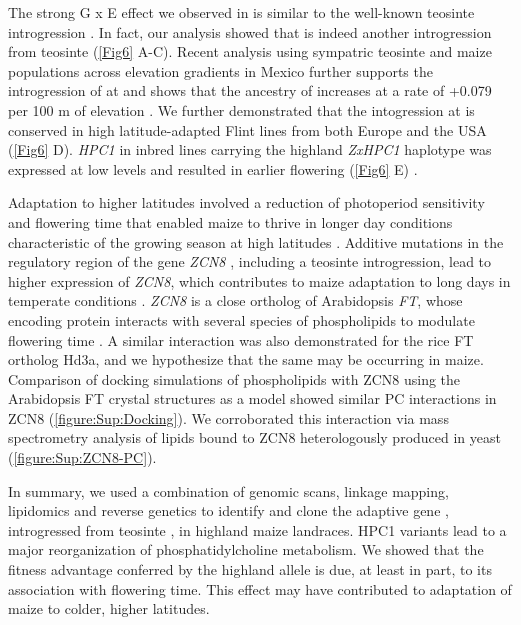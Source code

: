 The strong G x E effect we observed in \hpc is similar to the well-known teosinte \mex introgression \invfour \citep{crow2020}. 
In fact, our analysis showed that \hpc is indeed another introgression from teosinte \mex  (\autoref{Fig6} A-C). 
Recent analysis using sympatric teosinte and maize populations across elevation gradients in Mexico further supports the introgression of \mex at \hpc and shows that the \mex ancestry of \hpc increases at a rate of +0.079 per 100 m of elevation \citep{calfee2021-mr}.
We further demonstrated that the \mex intogression at \hpc is conserved in high latitude-adapted Flint lines from both Europe and the USA (\autoref{Fig6} D).
\textit{HPC1} in inbred lines carrying the highland \textit{ZxHPC1} \mex haplotype was expressed at low levels and resulted in earlier flowering (\autoref{Fig6} E) \citep{kremling2018-gn}.  

Adaptation to higher latitudes involved a reduction of photoperiod sensitivity and flowering time that enabled maize to thrive in longer day conditions characteristic of the growing season at high latitudes \citep{hung2012-ms, swarts2017-ge, yang2013-lg, huang2018-ga}.
Additive mutations in the regulatory region of the gene \textit{ZCN8} \citep{lazakis2011-nq}, including a teosinte \mex introgression, lead to higher expression of \textit{ZCN8}, which contributes to maize adaptation to long days in temperate conditions \citep{guo2019-pn}.
\textit{ZCN8} is a close ortholog of Arabidopsis \textit{FT}, whose encoding protein interacts with several species of phospholipids to modulate flowering time \citep{nakamura2014-qf, susila2021-dz}. 
A similar interaction was also demonstrated for the rice FT ortholog Hd3a, \citep{qu2021-wc} and we hypothesize that the same may be occurring in maize. 
Comparison of docking simulations of phospholipids with ZCN8 using the Arabidopsis FT crystal structures as a model \citep{nakamura2019-ht} showed similar PC interactions in ZCN8 (\autoref{figure:Sup:Docking}).
We corroborated this interaction via mass spectrometry analysis of lipids bound to ZCN8 heterologously produced in yeast (\autoref{figure:Sup:ZCN8-PC}). 

In summary, we used a combination of genomic scans, linkage mapping, lipidomics and reverse genetics to identify and clone the adaptive gene \hpc, introgressed from teosinte  \mex, in highland maize landraces. 
HPC1 variants lead to a major reorganization of phosphatidylcholine metabolism. 
We showed that the fitness advantage conferred by the \hpc highland \mex allele is due, at least in part, to its association with flowering time. 
This effect may have contributed to adaptation of maize to colder, higher latitudes.

